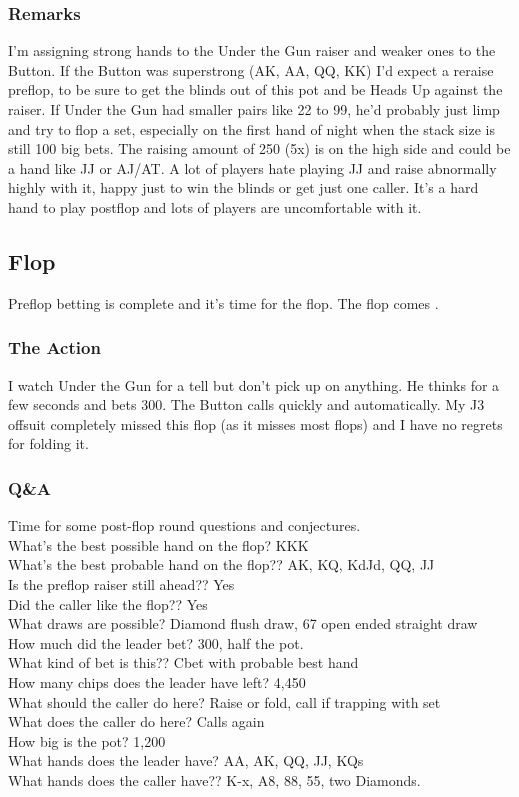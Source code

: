 \subsubsection*{Remarks}
I'm assigning strong hands to the Under the Gun raiser and
weaker ones to the Button.
If the Button was superstrong (AK, AA, QQ, KK) I'd expect a reraise
preflop, to be sure to get the blinds out of this pot and be Heads Up
against the raiser. If Under the Gun had smaller pairs like 22 to 99,
he'd probably just limp and try to flop a set, especially on
the first hand of night when the stack size is still 100 big bets.
The raising amount of 250 (5x) is on the high side and could be
a hand like JJ or AJ/AT. A lot of players hate playing JJ and raise
abnormally highly with it, happy just to win the blinds or get
just one caller. It's a hard hand to play postflop and lots
of players are uncomfortable with it.

\subsection*{Flop}

Preflop betting is complete and it's time for the flop.
The flop comes \Kc\eigd\fived.

\subsubsection*{The Action}
I watch Under the Gun for a tell but don't pick
up on anything. He thinks for a few seconds and bets 300. The Button calls
quickly and automatically. My J3 offsuit completely missed this
flop (as it misses most flops) and I have no regrets for folding it.

\subsubsection*{Q\&A}
Time for some post-flop round questions and conjectures. \\
What's the best possible hand on the flop? KKK \\
What's the best probable hand on the flop?? AK, KQ, KdJd, QQ, JJ \\
Is the preflop raiser still ahead?? Yes \\
Did the caller like the flop?? Yes \\
What draws are possible? Diamond flush draw, 67 open ended straight draw \\
How much did the leader bet? 300, half the pot. \\
What kind of bet is this?? Cbet with probable best hand \\
How many chips does the leader have left? 4,450 \\
What should the caller do here? Raise or fold, call if trapping with set \\
What does the caller do here? Calls again \\
How big is the pot? 1,200 \\
What hands does the leader have? AA, AK, QQ, JJ, KQs \\
What hands does the caller have?? K-x, A8, 88, 55, two Diamonds.


